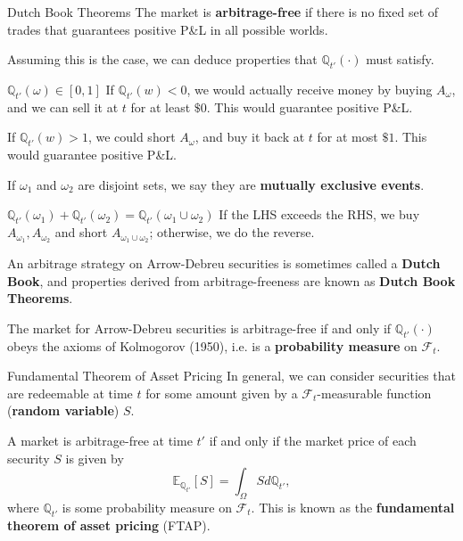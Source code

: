 \documentclass{beamer}
\begin{document}
\begin{frame}{Dutch Book Theorems}
	The market is \textbf{arbitrage-free} if there is no fixed set of trades that guarantees positive P\&L in all possible worlds.

	Assuming this is the case, we can deduce properties that $\mathbb{Q}_{t'}(\cdot)$ must satisfy.

	\begin{block}{$\mathbb{Q}_{t'}(\omega) \in [0,1]$}
		If $\mathbb{Q}_{t'}(w)<0$, we would actually receive money by buying $A_\omega$, and we can sell it at $t$ for at least $\$0$. This would guarantee positive P\&L.

		If $\mathbb{Q}_{t'}(w)>1$, we could short $A_\omega$, and buy it back at $t$ for at most $\$1$. This would guarantee positive P\&L.
	\end{block}

	If $\omega_1$ and $\omega_2$ are disjoint sets, we say they are \textbf{mutually exclusive events}.
	\begin{block}{$\mathbb{Q}_{t'}(\omega_1) + \mathbb{Q}_{t'}(\omega_2) = \mathbb{Q}_{t'}(\omega_1 \cup \omega_2)$}
		If the LHS exceeds the RHS, we buy $A_{\omega_1},A_{\omega_2}$ and short $A_{\omega_1\cup\omega_2}$; otherwise, we do the reverse.
	\end{block}

	An arbitrage strategy on Arrow-Debreu securities is sometimes called a \textbf{Dutch Book}, and properties derived from arbitrage-freeness are known as \textbf{Dutch Book Theorems}.


	The market for Arrow-Debreu securities is arbitrage-free if and only if $\mathbb{Q}_{t'}(\cdot)$ obeys the axioms of Kolmogorov (1950), i.e. is a \textbf{probability measure} on $\mathcal{F}_t$.%
\end{frame}

\begin{frame}{Fundamental Theorem of Asset Pricing}
	In general, we can consider securities that are redeemable at time $t$ for some amount given by a $\mathcal{F}_t$-measurable function (\textbf{random variable}) $S$.

	A market is arbitrage-free at time $t'$ if and only if the market price of each security $S$ is given by
	$$\mathbb{E}_{\mathbb{Q}_{t'}}[S] = \int_\Omega S d\mathbb{Q}_{t'},$$
	where $\mathbb{Q}_{t'}$ is some probability measure on $\mathcal{F}_t$. This is known as the \textbf{fundamental theorem of asset pricing} (FTAP).
\end{frame}
\end{document}
